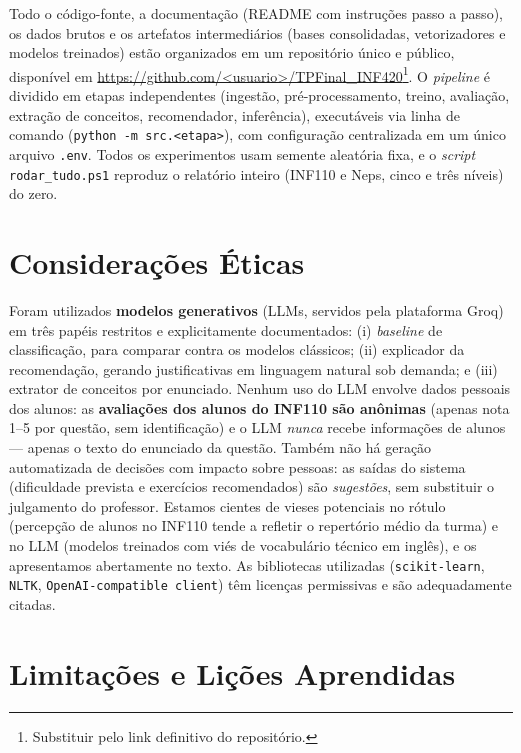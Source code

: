 \documentclass[sigconf]{webmedia}
\begin{document}
Todo o código-fonte, a documentação (README com instruções passo a passo), os dados brutos e os artefatos intermediários (bases consolidadas, vetorizadores e modelos treinados) estão organizados em um repositório único e público, disponível em \url{https://github.com/<usuario>/TPFinal_INF420}\footnote{Substituir pelo link definitivo do repositório.}. O \textit{pipeline} é dividido em etapas independentes (ingestão, pré-processamento, treino, avaliação, extração de conceitos, recomendador, inferência), executáveis via linha de comando (\texttt{python -m src.<etapa>}), com configuração centralizada em um único arquivo \texttt{.env}. Todos os experimentos usam semente aleatória fixa, e o \textit{script} \texttt{rodar\_tudo.ps1} reproduz o relatório inteiro (INF110 e Neps, cinco e três níveis) do zero.

\section{Considerações Éticas}
\label{sec:etica}

Foram utilizados \textbf{modelos generativos} (LLMs, servidos pela plataforma Groq) em três papéis restritos e explicitamente documentados: (i) \textit{baseline} de classificação, para comparar contra os modelos clássicos; (ii) explicador da recomendação, gerando justificativas em linguagem natural sob demanda; e (iii) extrator de conceitos por enunciado. Nenhum uso do LLM envolve dados pessoais dos alunos: as \textbf{avaliações dos alunos do INF110 são anônimas} (apenas nota 1--5 por questão, sem identificação) e o LLM \emph{nunca} recebe informações de alunos --- apenas o texto do enunciado da questão. Também não há geração automatizada de decisões com impacto sobre pessoas: as saídas do sistema (dificuldade prevista e exercícios recomendados) são \emph{sugestões}, sem substituir o julgamento do professor. Estamos cientes de vieses potenciais no rótulo (percepção de alunos no INF110 tende a refletir o repertório médio da turma) e no LLM (modelos treinados com viés de vocabulário técnico em inglês), e os apresentamos abertamente no texto. As bibliotecas utilizadas (\texttt{scikit-learn}, \texttt{NLTK}, \texttt{OpenAI-compatible client}) têm licenças permissivas e são adequadamente citadas.

\section{Limitações e Lições Aprendidas}
\label{sec:limitacoes}
\end{document}
